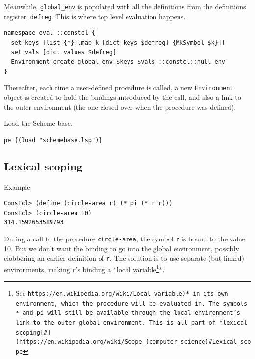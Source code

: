 \documentclass[twoside,9pt]{report}
\begin{document}
Meanwhile, \texttt{global\_env} is populated with all the definitions from the definitions register, \texttt{defreg}. This is where top level evaluation happens.

\noindent\makebox[\linewidth]{\rule{\linewidth}{0.4pt}}
\begin{lstlisting}
namespace eval ::constcl {
  set keys [list {*}[lmap k [dict keys $defreg] {MkSymbol $k}]]
  set vals [dict values $defreg]
  Environment create global_env $keys $vals ::constcl::null_env
}
\end{lstlisting}
\noindent\makebox[\linewidth]{\rule{\linewidth}{0.4pt}}

Thereafter, each time a user-defined procedure is called, a new \texttt{Environment} object is created to hold the bindings introduced by the call, and also a link to the outer environment (the one closed over when the procedure was defined).


Load the Scheme base.

\noindent\makebox[\linewidth]{\rule{\linewidth}{0.4pt}}
\begin{lstlisting}
pe {(load "schemebase.lsp")}
\end{lstlisting}
\noindent\makebox[\linewidth]{\rule{\linewidth}{0.4pt}}
\subsection{Lexical scoping}
\label{lexical-scoping}

Example:

\noindent\makebox[\linewidth]{\rule{\linewidth}{0.4pt}}
\begin{lstlisting}
ConsTcl> (define (circle-area r) (* pi (* r r)))
ConsTcl> (circle-area 10)
314.1592653589793
\end{lstlisting}
\noindent\makebox[\linewidth]{\rule{\linewidth}{0.4pt}}

During a call to the procedure \texttt{circle-area}, the symbol \texttt{r} is bound to the value 10. But we don't want the binding to go into the global environment, possibly clobbering an earlier definition of \texttt{r}. The solution is to use separate (but linked) environments, making \texttt{r}'s binding a *local variable\footnote{See \texttt{https://en.wikipedia.org/wiki/Local\_variable)* in its own environment, which the procedure will be evaluated in. The symbols \texttt{*} and \texttt{pi} will still be available through the local environment's link to the outer global environment. This is all part of *lexical scoping[\#](https://en.wikipedia.org/wiki/Scope\_(computer\_science)\#Lexical\_scope}}*.
\end{document}
